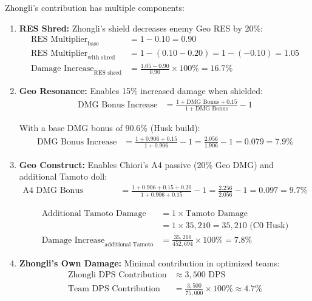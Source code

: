 \documentclass[12pt,a4paper]{article}
\begin{document}
Zhongli's contribution has multiple components:

\begin{enumerate}
    \item \textbf{RES Shred:} Zhongli's shield decreases enemy Geo RES by 20\%:
    \begin{align}
    \text{RES Multiplier}_{\text{base}} &= 1 - 0.10 = 0.90 \\
    \text{RES Multiplier}_{\text{with shred}} &= 1 - (0.10 - 0.20) = 1 - (-0.10) = 1.05 \\
    \text{Damage Increase}_{\text{RES shred}} &= \frac{1.05 - 0.90}{0.90} \times 100\% = 16.7\%
    \end{align}
    
    \item \textbf{Geo Resonance:} Enables 15\% increased damage when shielded:
    \begin{align}
    \text{DMG Bonus Increase} &= \frac{1 + \text{DMG Bonus} + 0.15}{1 + \text{DMG Bonus}} - 1
    \end{align}
    
    With a base DMG bonus of 90.6\% (Husk build):
    \begin{align}
    \text{DMG Bonus Increase} &= \frac{1 + 0.906 + 0.15}{1 + 0.906} - 1 = \frac{2.056}{1.906} - 1 = 0.079 = 7.9\%
    \end{align}
    
    \item \textbf{Geo Construct:} Enables Chiori's A4 passive (20\% Geo DMG) and additional Tamoto doll:
    \begin{align}
    \text{A4 DMG Bonus Increase} &= \frac{1 + 0.906 + 0.15 + 0.20}{1 + 0.906 + 0.15} - 1 = \frac{2.256}{2.056} - 1 = 0.097 = 9.7\%
    \end{align}
    
    \begin{align}
    \text{Additional Tamoto Damage} &= 1 \times \text{Tamoto Damage} \\
    &= 1 \times 35,210 = 35,210 \text{ (C0 Husk)} \\
    \text{Damage Increase}_{\text{additional Tamoto}} &= \frac{35,210}{452,694} \times 100\% = 7.8\%
    \end{align}
    
    \item \textbf{Zhongli's Own Damage:} Minimal contribution in optimized teams:
    \begin{align}
    \text{Zhongli DPS Contribution} &\approx 3,500 \text{ DPS} \\
    \text{Team DPS Contribution} &= \frac{3,500}{75,000} \times 100\% \approx 4.7\%
    \end{align}
\end{enumerate}
\end{document}
